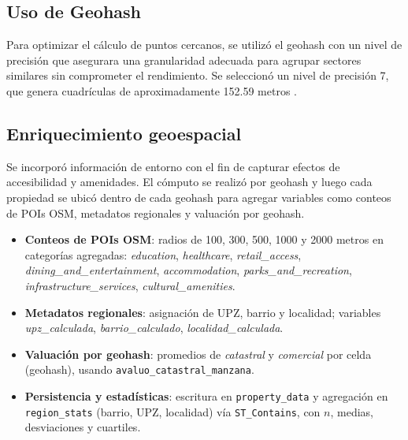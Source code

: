 
\subsection*{Uso de Geohash}
Para optimizar el cálculo de puntos cercanos, se utilizó el geohash con un nivel de precisión que 
asegurara una granularidad adecuada para agrupar sectores similares sin comprometer el rendimiento. 
Se seleccionó un nivel de precisión 7, que genera cuadrículas de aproximadamente 
152.59 metros \cite{geohash_size}.

\subsection*{Enriquecimiento geoespacial}
Se incorporó información de entorno con el fin de capturar efectos de accesibilidad y amenidades. 
El cómputo se realizó por geohash y luego cada propiedad se ubicó dentro de cada geohash para 
agregar variables como conteos de POIs OSM, metadatos regionales y valuación por geohash.
\begin{itemize}
    \item \textbf{Conteos de POIs OSM}: radios de 100, 300, 500, 1000 y 2000 metros en categorías agregadas: \emph{education}, \emph{healthcare}, \emph{retail\_access}, \emph{dining\_and\_entertainment}, \emph{accommodation}, \emph{parks\_and\_recreation}, \emph{infrastructure\_services}, \emph{cultural\_amenities}.
    \item \textbf{Metadatos regionales}: asignación de UPZ, barrio y localidad; variables \emph{upz\_calculada}, \emph{barrio\_calculado}, \emph{localidad\_calculada}.
    \item \textbf{Valuación por geohash}: promedios de \emph{catastral} y \emph{comercial} por celda (geohash), usando \texttt{avaluo\_catastral\_manzana}.
    \item \textbf{Persistencia y estadísticas}: escritura en \texttt{property\_data} y agregación en \texttt{region\_stats} (barrio, UPZ, localidad) vía \texttt{ST\_Contains}, con \(n\), medias, desviaciones y cuartiles.
\end{itemize}


